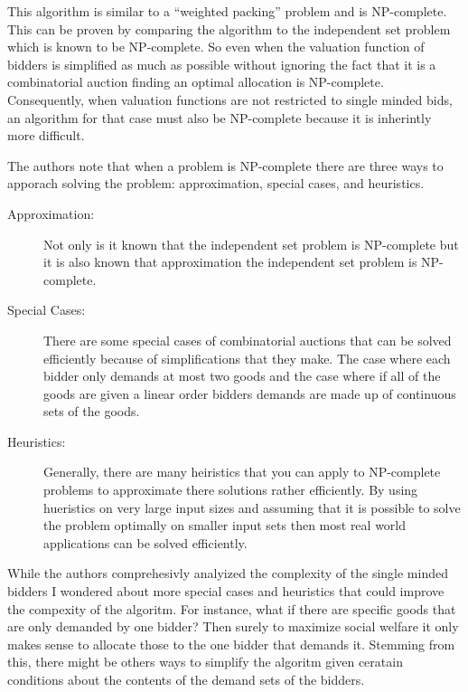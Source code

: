 \documentclass[10pt,onecolumn,letterpaper]{article}
\theoremstyle{definition}
\begin{document}
This algorithm is similar to a ``weighted packing'' problem and is NP-complete. This can be proven by comparing the algorithm to the independent set problem which is known to be NP-complete. So even when the valuation function of bidders is simplified as much as possible without ignoring the fact that it is a combinatorial auction finding an optimal allocation is NP-complete. Consequently, when valuation functions are not restricted to single minded bids, an algorithm for that case must also be NP-complete because it is inherintly more difficult. 

The authors note that when a problem is NP-complete there are three ways to apporach solving the problem: approximation, special cases, and heuristics. 

\begin{description}
  \item [Approximation:] Not only is it known that the independent set problem is NP-complete but it is also known that approximation the independent set problem is NP-complete. 

  \item [Special Cases:] There are some special cases of combinatorial auctions that can be solved efficiently because of simplifications that they make. The case where each bidder only demands at most two goods and the case where if all of the goods are given a linear order bidders demands are made up of continuous sets of the goods.

  \item [Heuristics:] Generally, there are many heiristics that you can apply to NP-complete problems to approximate there solutions rather efficiently. By using hueristics on very large input sizes and assuming that it is possible to solve the problem optimally on smaller input sets then most real world applications can be solved efficiently. 

\end{description}

While the authors comprehesivly analyized the complexity of the single minded bidders I wondered about more special cases and heuristics that could improve the compexity of the algoritm. For instance, what if there are specific goods that are only demanded by one bidder? Then surely to maximize social welfare it only makes sense to allocate those to the one bidder that demands it. Stemming from this, there might be others ways to simplify the algoritm given ceratain conditions about the contents of the demand sets of the bidders.
\end{document}
